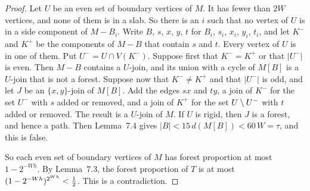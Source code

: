 \begin{proof}
 Let $U$ be an even set of boundary vertices of $M$. It has fewer than $2W$
vertices, and none of them is in a slab. So there is an $i$ such that no vertex of $U$ is in a
side component of $M-B_i$. Write $B$, $s$, $x$, $y$, $t$ for $B_i$, $s_i$, $x_i$, $y_i$, $t_i$,
and let $K^{-}$ and $K^{+}$ be the components of $M-B$ that contain $s$ and $t$. Every vertex
of $U$ is in one of them. Put $U^{-}=U\cap V(K^{-})$. Suppose first that $K^{-}=K^{+}$ or that
$|U^{-}|$ is even. Then $M-B$ contains a $U$-join, and its union with a cycle of $M[B]$ is a
$U$-join that is not a forest. Suppose now that $K^{-}\ne K^{+}$ and that $|U^{-}|$ is odd, and
let $J$ be an $\{x,y\}$-join of $M[B]$. Add the edges $sx$ and $ty$, a join of $K^{-}$ for the
set $U^{-}$ with $s$ added or removed, and a join of $K^{+}$ for the set $U\setminus U^{-}$ with $t$
added or removed. The result is a $U$-join of $M$. If $U$ is rigid, then $J$ is a forest, and hence a path. Then
Lemma~7.4 gives $|B|<15\,d(M[B])<60\,W=\tau$, and this is false.

So each even set of boundary vertices of $M$ has forest proportion at most $1-2^{-Wh}$. By
Lemma~7.3, the forest proportion of $T$ is at most
$(1-2^{-Wh})^{2^{Wh}}<\tfrac12$. This is a contradiction.
\end{proof}
